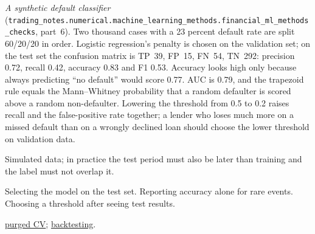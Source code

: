 \begin{qfmethod}
 \emph{A synthetic default classifier} (\nolinkurl{trading_notes.numerical.machine_learning_methods.financial_ml_methods_checks}, part~6). Two thousand cases with a 23 percent default rate are split 60/20/20 in order. Logistic regression's penalty is chosen on the validation set; on the test set the confusion matrix is TP~39, FP~15, FN~54, TN~292: precision 0.72, recall 0.42, accuracy 0.83 and F1 0.53. Accuracy looks high only because always predicting ``no default'' would score 0.77. AUC is 0.79, and the trapezoid rule equals the Mann--Whitney probability that a random defaulter is scored above a random non-defaulter. Lowering the threshold from 0.5 to 0.2 raises recall and the false-positive rate together; a lender who loses much more on a missed default than on a wrongly declined loan should choose the lower threshold on validation data.

 Simulated data; in practice the test period must also be later than training and the label must not overlap it.

 Selecting the model on the test set. Reporting accuracy alone for rare events. Choosing a threshold after seeing test results.

 \hyperref[meth:purged-embargoed-cross-validation]{purged CV}; \hyperref[meth:backtest-design-evaluation]{backtesting}.

\end{qfmethod}
